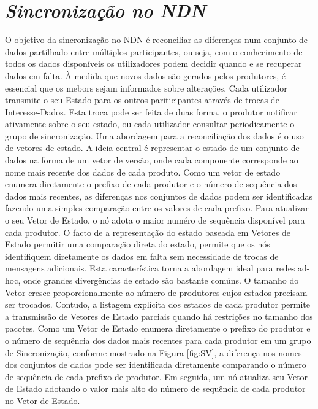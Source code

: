 \section{\emph{Sincronização no \gls{NDN}}}
\label{sub:Sinc__NDN}
O objetivo da sincronização no \gls{NDN} é reconciliar as diferenças num conjunto de dados partilhado entre múltiplos participantes, ou seja, com o conhecimento de todos os dados disponíveis os utilizadores podem decidir quando e se recuperar dados em falta. À medida que novos dados são gerados pelos produtores, é essencial que os mebors sejam informados sobre alterações. Cada utilizador transmite o seu Estado para os outros pariticipantes através de trocas de Interesse-Dados. Esta troca pode ser feita de duas forma, o produtor notificar ativamente sobre o seu estado, ou cada utilizador consultar periodicamente o grupo de sincronização.
Uma abordagem para a reconciliação dos dados é o uso de vetores de estado. A ideia central é representar o estado de um conjunto de dados na forma de um vetor de versão, onde cada componente corresponde ao nome mais recente dos dados de cada produto. Como um vetor de estado enumera diretamente o prefixo de cada produtor e o número de sequência dos dados mais recentes, as diferenças nos conjuntos de dados podem ser identificadas fazendo uma simples comparação entre os valores de cada prefixo. Para atualizar o seu Vetor de Estado, o nó adota o maior numéro de sequência disponível para cada produtor. O facto de a representação do estado baseada em Vetores de Estado permitir uma comparação direta do estado, permite que os nós identifiquem diretamente os dados em falta sem necessidade de trocas de mensagens adicionais. Esta característica torna a abordagem ideal para redes ad-hoc, onde grandes divergências de estado são bastante comúns. O tamanho do Vetor cresce proporcionalmente ao número de produtores cujos estados precisam ser trocados. Contudo, a listagem explícita dos estados de cada produtor permite a transmissão de Vetores de Estado parciais quando há restrições no tamanho dos pacotes.
Como um Vetor de Estado enumera diretamente o prefixo do produtor e o número de sequência dos dados mais recentes para cada produtor em um grupo de Sincronização, conforme mostrado na Figura \ref{fig:SV}, a diferença nos nomes dos conjuntos de dados pode ser identificada diretamente comparando o número de sequência de cada prefixo de produtor. Em seguida, um nó atualiza seu Vetor de Estado adotando o valor mais alto do número de sequência de cada produtor no Vetor de Estado.

